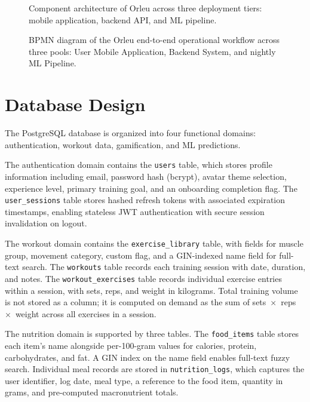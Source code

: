 \documentclass[12pt, a4paper]{report}
\begin{document}
\begin{figure}[H]
  \centering
  \caption{Component architecture of Orleu across three deployment tiers: mobile application, backend API, and ML pipeline.}
  \label{fig:component}
\end{figure}

\begin{figure}[H]
  \centering
  \caption{BPMN diagram of the Orleu end-to-end operational workflow across three pools: User Mobile Application, Backend System, and nightly ML Pipeline.}
  \label{fig:bpmn}
\end{figure}

\section{Database Design}

The PostgreSQL database is organized into four functional domains: authentication, workout data, gamification, and ML predictions.

The authentication domain contains the \texttt{users} table, which stores profile information including email, password hash (bcrypt), avatar theme selection, experience level, primary training goal, and an onboarding completion flag. The \texttt{user\_sessions} table stores hashed refresh tokens with associated expiration timestamps, enabling stateless JWT authentication with secure session invalidation on logout.

The workout domain contains the \texttt{exercise\_library} table, with fields for muscle group, movement category, custom flag, and a GIN-indexed name field for full-text search. The \texttt{workouts} table records each training session with date, duration, and notes. The \texttt{workout\_exercises} table records individual exercise entries within a session, with sets, reps, and weight in kilograms. Total training volume is not stored as a column; it is computed on demand as the sum of sets~$\times$~reps~$\times$~weight across all exercises in a session.

The nutrition domain is supported by three tables. The \texttt{food\_items} table stores each item's name alongside per-100-gram values for calories, protein, carbohydrates, and fat. A GIN index on the name field enables full-text fuzzy search. Individual meal records are stored in \texttt{nutrition\_logs}, which captures the user identifier, log date, meal type, a reference to the food item, quantity in grams, and pre-computed macronutrient totals.
\end{document}
